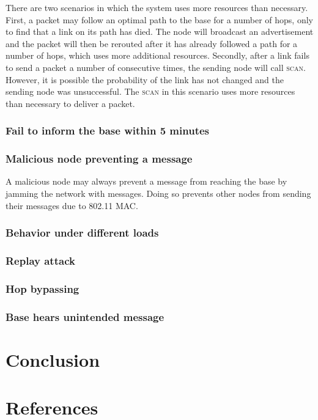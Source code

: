 \documentclass[letterpaper]{article}
\begin{document}
There are two scenarios in which the system uses more resources than necessary. First, a packet may follow an optimal path
to the base for a number of hops, only to find that a link on its path has died. The node will broadcast an advertisement
and the packet will then be rerouted after it has already followed a path for a number of hops, which uses more additional
resources. Secondly, after a link fails to send a packet a number of consecutive times, the sending node will call
\textsc{scan}. However, it is possible the probability of the link has not changed and the sending node was unsuccessful.
The \textsc{scan} in this scenario uses more resources than necessary to deliver a packet.

\subsubsection{Fail to inform the base within 5 minutes}




\subsubsection{Malicious node preventing a message}

A malicious node may always prevent a message from reaching the base by jamming the network with messages. Doing so prevents
other nodes from sending their messages due to 802.11 MAC.

\subsubsection{Behavior under different loads}

\subsubsection{Replay attack}

\subsubsection{Hop bypassing}

\subsubsection{Base hears unintended message}

\section{Conclusion}

\section{References}
\end{document}
